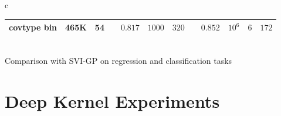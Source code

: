 \documentclass[a0,portrait]{a0poster}
\begin{document}
\begin{multicols}{2}
\begin{center}
{\begin{tabular}{c}
\begin{tabular}{lll l cll l clll}
    covtype bin & 465K & 54 &&
    $0.817$ & $1000$ & $320$ &&
    $\mathbf{0.852}$ & $10^6$ & $6$ & $172$\\
    \bottomrule
  \end{tabular}\\
Comparison with SVI-GP \citep{hensman2013} on regression and classification
tasks
\end{tabular}
}
\end{center}
\section*{\LARGE \color{NavyBlue} Deep Kernel Experiments}
    
\begin{center}
\end{center}

\vspace{0.5cm}

\begin{center}
\end{center}
\end{multicols}
\end{document}
